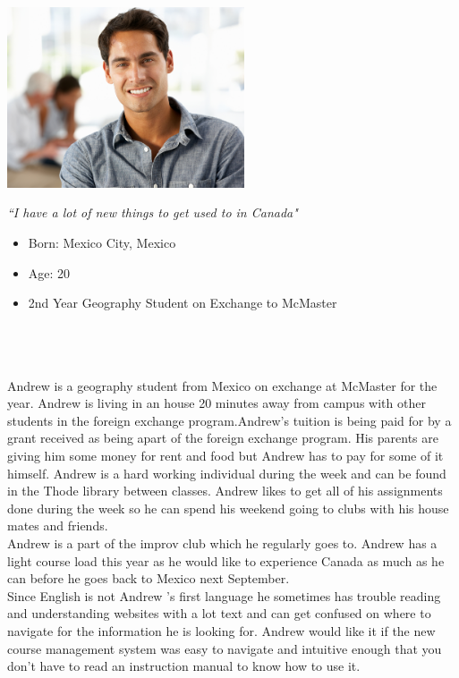 \documentclass[12pt]{article}
\begin{document}
\begin{minipage}{70mm}
\includegraphics[width=70mm]{Adrian.png}
\begin{center}
\emph{``I have a lot of new things to get used to in Canada"}
\end{center}
\end{minipage}\hfill
\begin{minipage}{\textwidth}
\begin{itemize}
\item Born: Mexico City, Mexico
\item Age: 20
\item 2nd Year Geography Student on Exchange to McMaster
\end{itemize}
\end{minipage}\\\\\\

Andrew is a geography student from Mexico on exchange at McMaster for the year. Andrew is living in an house 20 minutes away from campus with other students in the foreign exchange program.Andrew's tuition is being paid for by a grant received as being apart of the foreign exchange program. His parents are giving him some money for rent and food but Andrew has to pay for some of it himself. Andrew is a hard working individual during the week and can be found in the Thode library between classes. Andrew likes to get all of his assignments done during the week so he can spend his weekend going to clubs with his house mates and friends.\\

Andrew is a part of the improv club which he regularly goes to. Andrew has a light course load this year as he would like to experience Canada as much as he can before he goes back to Mexico next September.\\

Since English is not Andrew 's first language he sometimes has trouble reading and understanding websites with a lot text and can get confused on where to navigate for the information he is looking for. Andrew would like it if the new course management system was easy to navigate and intuitive enough that you don't have to read an instruction manual to know how to use it.
\end{document}
